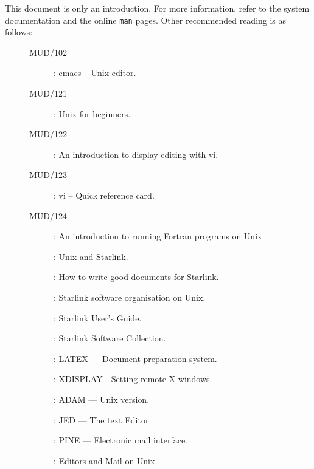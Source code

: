 \documentclass[twoside,11pt,nolof]{starlink}
\begin{document}
This document is only an introduction.
For more information, refer to the system documentation and the online \texttt{man}
pages.
Other recommended reading is as follows:

\begin{description}
\item[\mbox{}]\mbox{}
\begin{description}
\item [MUD/102]: emacs -- Unix editor.
\item [MUD/121]: Unix for beginners.
\item [MUD/122]: An introduction to display editing with vi.
\item [MUD/123]: vi -- Quick reference card.
\item [MUD/124]: An introduction to running Fortran programs on Unix
\item []: Unix and Starlink.
\item []: How to write good documents for Starlink.
\item []: Starlink software organisation on Unix.
\item []: Starlink User's Guide.
\item []: Starlink Software Collection.
\item []: LATEX --- Document preparation system.
\item []: XDISPLAY - Setting remote X windows.
\item []: ADAM --- Unix version.
\item []: JED --- The text Editor.
\item []: PINE --- Electronic mail interface.
\item []: Editors and Mail on Unix.
\end{description}

\end{description}
\end{document}
